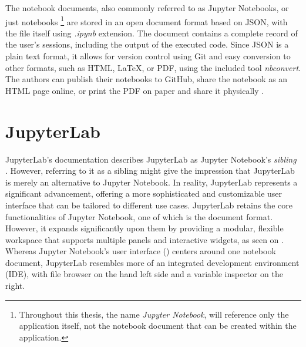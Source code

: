 \documentclass[
  digital,     %
  oneside,     %
  nosansbold,  %
  nocolorbold, %
  lof,         %
  nolot,         %
]{fithesis4}
\begin{document}
The notebook documents, also commonly referred to as Jupyter Notebooks, or just notebooks 
\footnote{Throughout this thesis, the name \emph{Jupyter Notebook}, will reference only the application itself, not the notebook document that can be created within the application.}
are stored in an open document format based on JSON, with the file itself using \emph{.ipynb} extension. The document contains a complete record of the user's sessions, including the output of the executed code. Since JSON is a plain text format, it allows for version control using Git and easy conversion to other formats, such as HTML, LaTeX, or PDF, using the included tool \emph{nbconvert}. The authors can publish their notebooks to GitHub, share the notebook as an HTML page online, or print the PDF on paper and share it physically \cite{kluyver2016jupyter}. 


\section{JupyterLab}

JupyterLab's documentation describes JupyterLab as Jupyter Notebook's \emph{sibling} \cite{jupyter_lab}. However, referring to it as a sibling might give the impression that JupyterLab is merely an alternative to Jupyter Notebook. In reality, JupyterLab represents a significant advancement, offering a more sophisticated and customizable user interface that can be tailored to different use cases. JupyterLab retains the core functionalities of Jupyter Notebook, one of which is the document format. However, it expands significantly upon them by providing a modular, flexible workspace that supports multiple panels and interactive widgets, as seen on . Whereas Jupyter Notebook's user interface () centers around one notebook document, JupyterLab resembles more of an integrated development environment (IDE), with file browser on the hand left side and a variable inspector on the right.
\end{document}
